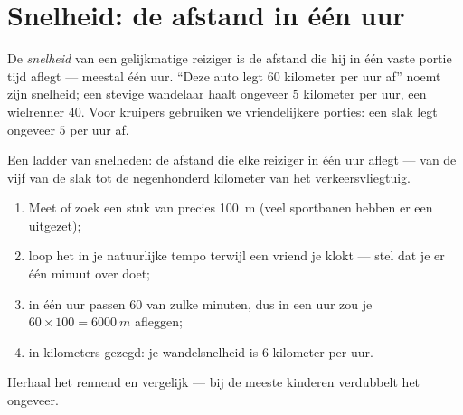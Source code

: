 \section{Snelheid: de afstand in één uur}

\begin{definition}[Snelheid]\label{def:g5:speed-distance-time:speed}
De \emph{snelheid} van een gelijkmatige reiziger is de
afstand die hij in één vaste portie tijd aflegt --- meestal één uur.
``Deze auto legt $60$ kilometer per uur af'' noemt zijn snelheid; een
stevige wandelaar haalt ongeveer $5$ kilometer per uur, een
wielrenner $40$. Voor kruipers gebruiken we vriendelijkere porties:
een slak legt ongeveer $5$  per uur af.
\end{definition}

\begin{omfigure}

{\small Een ladder van snelheden: de afstand die elke reiziger in één
uur aflegt --- van de vijf  van de slak tot de negenhonderd
kilometer van het verkeersvliegtuig.}
\end{omfigure}

\begin{method}\label{met:g5:speed-distance-time:measure}
\begin{enumerate}
  \item Meet of zoek een stuk van precies \qty{100}{m} (veel
        sportbanen hebben er een uitgezet);
  \item loop het in je natuurlijke tempo terwijl een vriend je klokt
        --- stel dat je er één minuut over doet;
  \item in één uur passen $60$ van zulke minuten, dus in een uur zou
        je $60 \times 100 = \qty{6000}{m}$ afleggen;
  \item in kilometers gezegd: je wandelsnelheid is $6$ kilometer per
        uur.
\end{enumerate}
Herhaal het rennend en vergelijk --- bij de meeste kinderen verdubbelt
het ongeveer.
\end{method}

